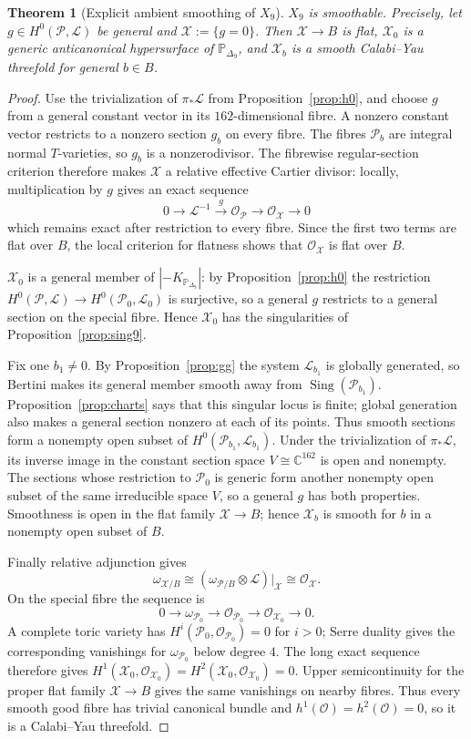 \documentclass[11pt]{amsart}
\newtheorem{theorem}{Theorem}[section]
\theoremstyle{definition}
\theoremstyle{remark}
\theoremstyle{plain}
\newcommand{\CC}{\mathbb{C}}
\newcommand{\PP}{\mathbb{P}}
\newcommand{\cO}{\mathcal{O}}
\newcommand{\cX}{\mathcal{X}}
\newcommand{\cP}{\mathcal{P}}
\newcommand{\cL}{\mathcal{L}}
\newcommand{\Sing}{\operatorname{Sing}}
\begin{document}


\begin{theorem}[Explicit ambient smoothing of $X_9$]\label{thm:B}
$X_9$ is smoothable.  Precisely, let $g \in H^0(\cP,\cL)$ be general and
$\cX := \{g = 0\}$.  Then $\cX \to B$ is flat, $\cX_0$ is a generic
anticanonical hypersurface of $\PP_{\Delta_9}$, and $\cX_b$ is a smooth
Calabi--Yau threefold for general $b\in B$.
\end{theorem}

\begin{proof}
Use the trivialization of $\pi_*\cL$ from Proposition~\ref{prop:h0}, and choose
$g$ from a general constant vector in its $162$-dimensional fibre.  A nonzero
constant vector restricts to a nonzero section $g_b$ on every fibre.  The
fibres $\cP_b$ are integral normal $T$-varieties, so $g_b$ is a
nonzerodivisor.  The fibrewise regular-section criterion therefore makes
$\cX$ a relative effective Cartier divisor: locally, multiplication by $g$
gives an exact sequence
\[
 0\longrightarrow\cL^{-1}\xrightarrow{\ g\ }\cO_{\cP}
 \longrightarrow\cO_{\cX}\longrightarrow0
\]
which remains exact after restriction to every fibre.  Since the first two
terms are flat over $B$, the local criterion for flatness shows that
$\cO_{\cX}$ is flat over $B$.

$\cX_0$ is a general member of $|-K_{\PP_{\Delta_9}}|$: by
Proposition~\ref{prop:h0} the restriction
$H^0(\cP,\cL) \to H^0(\cP_0,\cL_0)$ is
surjective, so a general $g$ restricts to a general section on the special
fibre.  Hence $\cX_0$ has the singularities of Proposition~\ref{prop:sing9}.

Fix one $b_1\ne0$.  By Proposition~\ref{prop:gg} the system $\cL_{b_1}$ is
globally generated, so Bertini makes its general member smooth away from
$\Sing(\cP_{b_1})$.  Proposition~\ref{prop:charts} says that this singular
locus is finite; global generation also makes a general section nonzero at
each of its points.  Thus smooth sections form a nonempty open subset of
$H^0(\cP_{b_1},\cL_{b_1})$.  Under the trivialization of $\pi_*\cL$, its inverse
image in the constant section space $V\cong\CC^{162}$ is open and nonempty.
The sections whose restriction to $\cP_0$ is generic form another nonempty
open subset of the same irreducible space $V$, so a general $g$ has both
properties.  Smoothness is open in the flat family $\cX\to B$; hence
$\cX_b$ is smooth for $b$ in a nonempty open subset of $B$.

Finally relative adjunction gives
\[
 \omega_{\cX/B}
 \cong(\omega_{\cP/B}\otimes\cL)|_{\cX}
 \cong\cO_{\cX}.
\]
On the special fibre the sequence is
\[
 0\longrightarrow\omega_{\cP_0}\longrightarrow\cO_{\cP_0}
 \longrightarrow\cO_{\cX_0}\longrightarrow0.
\]
A complete toric variety has $H^i(\cP_0,\cO_{\cP_0})=0$ for $i>0$; Serre
duality gives the corresponding vanishings for $\omega_{\cP_0}$ below degree
$4$.  The long exact sequence therefore gives
$H^1(\cX_0,\cO_{\cX_0})=H^2(\cX_0,\cO_{\cX_0})=0$.  Upper semicontinuity for
the proper flat family $\cX\to B$ gives the same vanishings on nearby fibres.
Thus every smooth good fibre has trivial canonical bundle and
$h^1(\cO)=h^2(\cO)=0$, so it is a Calabi--Yau threefold.
\end{proof}
\end{document}
